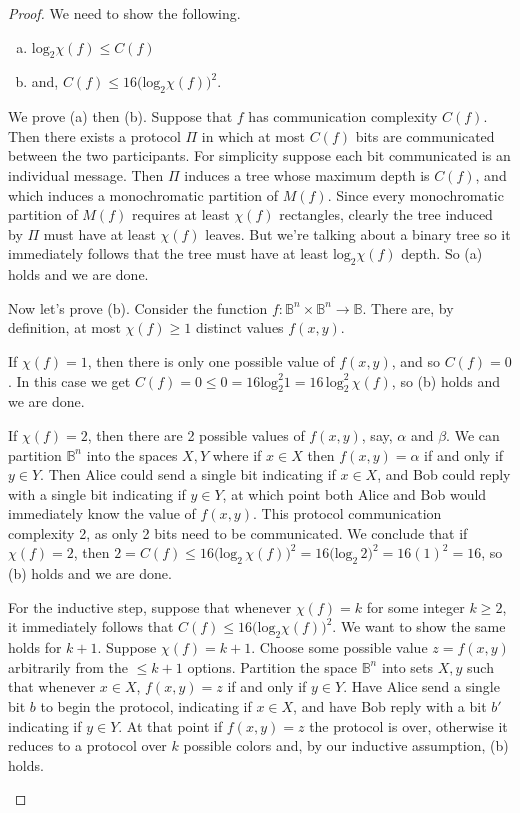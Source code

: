 \documentclass[12pt]{article}
\begin{document}
\begin{proof}
We need to show the following.
\begin{enumerate}[(a)]
	\item $\text{log}_2 \chi(f) \leq C(f)$
	\item and, $C(f) \leq 16 \big( \text{log}_2 \chi(f) \big)^2$.
\end{enumerate}
We prove (a) then (b).  Suppose that $f$ has communication complexity $C(f)$.
Then there exists a protocol $\Pi$ in which at most $C(f)$ bits are communicated
between the two participants.  For simplicity suppose each bit communicated is an individual
message.  Then $\Pi$ induces a tree whose maximum depth is $C(f)$, and which induces a monochromatic
partition of $M(f)$.  Since every monochromatic partition of $M(f)$ requires at least $\chi(f)$ rectangles, clearly the tree induced by $\Pi$ must have at least $\chi(f)$ leaves.  But we're talking about a binary tree so it immediately follows that the tree must have at least $\text{log}_2 \chi(f)$ depth.  So (a) holds and we are done.

Now let's prove (b).  Consider the function $f : \mathbb{B}^n \times \mathbb{B}^n \to \mathbb{B}$.
There are, by definition, at most $\chi(f) \geq 1$ distinct values $f(x, y)$.
\begin{description}
\item If $\chi(f) = 1$, then there is only one possible value of $f(x, y)$, and so $C(f) = 0$.
In this case we get $C(f) = 0 \leq 0 = 16 \text{log}_2^2 1 = 16 \, \text{log}_2^2 \, \chi(f)$, so (b) holds and we are done.
\item If $\chi(f) = 2$, then there are 2 possible values of $f(x, y)$, say, $\alpha$ and $\beta$.  We can partition $\mathbb{B}^n$ into the spaces $X, Y$ where if $x \in X$ then $f(x, y) = \alpha$ if and only if $y \in Y$.  Then Alice could send a single bit indicating if $x \in X$, and Bob could reply with a single bit indicating if $y \in Y$, at which point both Alice and Bob would immediately know the value of $f(x, y)$.  This protocol communication complexity 2, as only 2 bits need to be communicated.  We conclude that if $\chi(f) = 2$, then \(2 = C(f) \leq 16 \big( \text{log}_2 \, \chi(f) \big)^2 = 16 \big( \text{log}_2 \, 2 \big)^2 = 16 (1)^2 = 16\), so (b) holds and we are done.
\item For the inductive step, suppose that whenever $\chi(f) = k$ for some integer $k \geq 2$, it immediately follows that $C(f) \leq 16 \big( \text{log}_2 \chi(f) \big)^2$.  We want to show the same holds for $k + 1$.  Suppose $\chi(f) = k + 1$.  Choose some possible value $z = f(x, y)$ arbitrarily from the $\leq k + 1$ options.  Partition the space $\mathbb{B}^n$ into sets $X, y$ such that whenever $x \in X$, $f(x, y) = z$ if and only if $y \in Y$.  Have Alice send a single bit $b$ to begin the protocol, indicating if $x \in X$, and have Bob reply with a bit $b'$ indicating if $y \in Y$.  At that point if $f(x, y) = z$ the protocol is over, otherwise it reduces to a protocol over $k$ possible colors and, by our inductive assumption, (b) holds.
\end{description}
\end{proof}
\end{document}

